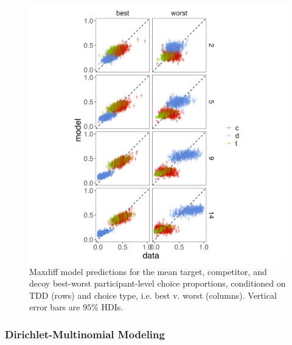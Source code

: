 \begin{figure}
   \includegraphics[width=\linewidth]{figures/maxdiff_2_subjectmeans_model_v_data.jpeg}
   \caption{Maxdiff model predictions for the mean target, competitor, and decoy best-worst participant-level choice proportions, conditioned on TDD (rows) and choice type, i.e. best v. worst (columns). Vertical error bars are $95\%$ HDIs.}
   \label{fig:maxdiff_sub_preds}
\end{figure}

\subsubsection{Dirichlet-Multinomial Modeling}

